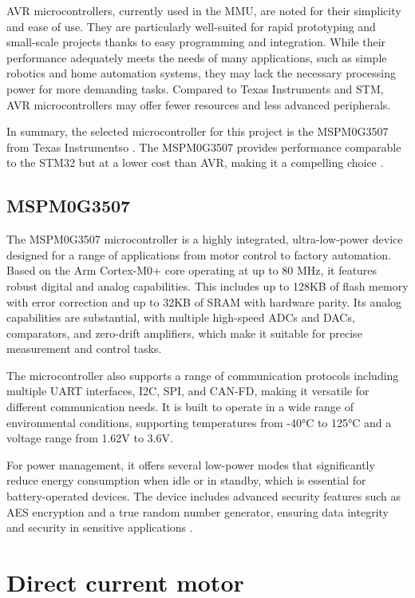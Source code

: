 AVR microcontrollers, currently used in the MMU, are noted for their simplicity and ease of use. They are particularly well-suited for rapid prototyping and small-scale projects thanks to easy programming and integration. While their performance adequately meets the needs of many applications, such as simple robotics and home automation systems, they may lack the necessary processing power for more demanding tasks. Compared to Texas Instruments and STM, AVR microcontrollers may offer fewer resources and less advanced peripherals.

In summary, the selected microcontroller for this project is the MSPM0G3507 from Texas Instrumentso \cite{mspm0g3507}. The MSPM0G3507 provides performance comparable to the STM32 but at a lower cost than AVR, making it a compelling choice \cite{avr-price}.

\subsection{MSPM0G3507}

The MSPM0G3507 microcontroller is a highly integrated, ultra-low-power device designed for a range of applications from motor control to factory automation. Based on the Arm Cortex-M0+ core \cite{arm-cortex} operating at up to 80 MHz, it features robust digital and analog capabilities. This includes up to 128KB of flash memory with error correction and up to 32KB of SRAM with hardware parity. Its analog capabilities are substantial, with multiple high-speed ADCs and DACs, comparators, and zero-drift amplifiers, which make it suitable for precise measurement and control tasks.

The microcontroller also supports a range of communication protocols including multiple UART interfaces, I2C, SPI, and CAN-FD, making it versatile for different communication needs. It is built to operate in a wide range of environmental conditions, supporting temperatures from -40°C to 125°C and a voltage range from 1.62V to 3.6V.

For power management, it offers several low-power modes that significantly reduce energy consumption when idle or in standby, which is essential for battery-operated devices. The device includes advanced security features such as AES encryption and a true random number generator, ensuring data integrity and security in sensitive applications \cite{mspm0-manual}.

\section{Direct current motor}

